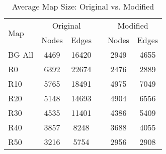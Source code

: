 \begin{table}[b]
  \caption{Average Map Size: Original vs. Modified}
  \label{table-graphsize}
  \centering
  \begin{tabular}{lccccc}
   \hline
  \multirow{2}{*}{Map} & \multicolumn{2}{c}{Original} &     & \multicolumn{2}{c}{Modified} \\
	\cline{2-3}
	\cline{5-6}
	& Nodes & Edges &  & Nodes & Edges \\
\hline
BG All &  4469 & 16420 & & 2949 &  4655 \\
R0 & 6392 & 22674 & &  2476 & 2889 \\
R10 & 5765 & 18491 & & 4975 & 7049 \\
R20 & 5148 & 14693  & & 4904 & 6556 \\ 
R30 & 4535 & 11401 &  & 4386 & 5409 \\
R40 & 3857 & 8248 & & 3688 & 4055 \\
R50 & 3216 & 5754 & & 2956 & 2908 \\ 
   \hline
\end{tabular}
\end{table}

